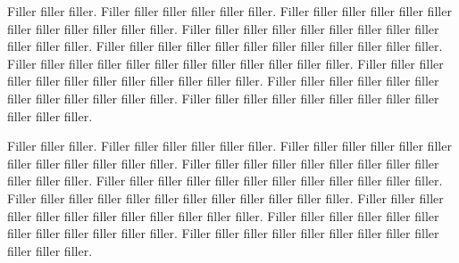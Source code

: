 \documentclass[landscape,twocolumn,letterpaper]{article}
\begin{document}
Filler filler filler.  Filler filler filler filler filler filler.
Filler filler filler filler filler filler filler filler filler filler
filler filler.  Filler filler filler filler filler filler filler filler
filler filler filler filler.  Filler filler filler filler filler filler
filler filler filler filler filler filler.  Filler filler filler filler
filler filler filler filler filler filler filler filler.  Filler filler
filler filler filler filler filler filler filler filler filler filler.
Filler filler filler filler filler filler filler filler filler filler
filler filler.  Filler filler filler filler filler filler filler filler
filler filler filler filler.

Filler filler filler.  Filler filler filler filler filler filler.
Filler filler filler filler filler filler filler filler filler filler
filler filler.  Filler filler filler filler filler filler filler filler
filler filler filler filler.  Filler filler filler filler filler filler
filler filler filler filler filler filler.  Filler filler filler filler
filler filler filler filler filler filler filler filler.  Filler filler
filler filler filler filler filler filler filler filler filler filler.
Filler filler filler filler filler filler filler filler filler filler
filler filler.  Filler filler filler filler filler filler filler filler
filler filler filler filler.
\end{document}
